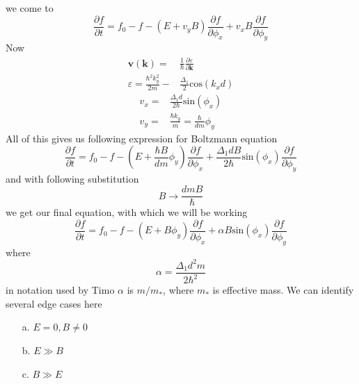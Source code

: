 \documentclass[40pt,letterpaper]{article}
\begin{document}
    we come to 
    \begin{equation}
     \frac{\partial f}{\partial t} = f_0 - f - 
     \left ( E + v_y B \right )\frac{\partial f}{\partial\phi_{x}}+
     v_x B \frac{\partial f}{\partial\phi_{y}}
    \end{equation}
    Now
    \begin{align}
     \mathbf{v}(\mathbf{k})=&\frac{1}{\hbar}\frac{\partial\varepsilon}{\partial\mathbf{k}} \\
     \varepsilon =\frac{\hbar^{2}k_{y}^2}{2m}-&\frac{\Delta_1}{2}\text{cos}(k_{x}d)
    \end{align}
    \begin{align}
     v_x=&\frac{\Delta_{1}d}{2\hbar}\text{sin}(\phi_x) \\
     v_y=&\frac{\hbar k_y}{m}=\frac{\hbar}{dm}\phi_y
    \end{align}
    All of this gives us following expression for Boltzmann equation
    \begin{equation}
     \frac{\partial f}{\partial t} = f_0 - f - 
     \left ( E + \frac{\hbar B}{dm}\phi_y \right ) \frac{\partial f}{\partial\phi_{x}}+
     \frac{\Delta_1 dB}{2\hbar}\text{sin}(\phi_x) \frac{\partial f}{\partial\phi_{y}}
    \end{equation}
    and with following substitution 
    \begin{equation}
     B\to\frac{dmB}{\hbar}
    \end{equation}
    we get our final equation, with which we will be working
    \begin{equation}\label{eq:boltzmann_dimmensionless}
     \boxed{
     \frac{\partial f}{\partial t} = f_0 - f - 
     \left ( E + B\phi_y \right ) \frac{\partial f}{\partial\phi_{x}}+
     \alpha B\text{sin}(\phi_x) \frac{\partial f}{\partial\phi_{y}}}
    \end{equation}
    where
    \begin{equation}
     \alpha=\frac{\Delta_{1}d^{2}m}{2\hbar^2}
    \end{equation}
    in notation used by Timo $\alpha$ is $m/m_*$, where $m_*$ is effective mass. We can identify several edge cases here
    \begin{enumerate}
     \item[a.]
      $E=0, B\ne 0$
     \item[b.]
      $E\gg B$
     \item[c.]
      $B\gg E$
    \end{enumerate}
\end{document}
